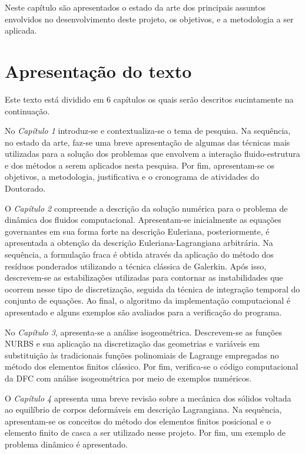 \documentclass[tese_patricia.tex]{subfiles}
\begin{document}
Neste capítulo são apresentados o estado da arte dos principais assuntos envolvidos no desenvolvimento deste projeto, os objetivos, e a metodologia a ser aplicada.


\section{Apresentação do texto}

Este texto está dividido em 6 capítulos os quais serão descritos sucintamente na continuação.

No \textit{Capítulo 1} introduz-se e contextualiza-se o tema de pesquisa. Na sequência, no estado da arte, faz-se uma breve apresentação de algumas das técnicas mais utilizadas para a solução dos problemas que envolvem a interação fluido-estrutura e dos métodos a serem aplicados nesta pesquisa. Por fim, apresentam-se os objetivos, a metodologia, justificativa e o cronograma de atividades do Doutorado.

O \textit{Capítulo 2} compreende a descrição da solução numérica para o problema de dinâmica dos fluidos computacional. Apresentam-se inicialmente as equações governantes em sua forma forte na descrição Euleriana, posteriormente, é apresentada a obtenção da descrição Euleriana-Lagrangiana arbitrária. Na sequência, a formulação fraca é obtida através da aplicação do método dos resíduos ponderados utilizando a técnica clássica de Galerkin. Após isso, descrevem-se as estabilizações utilizadas para contornar as instabilidades que ocorrem nesse tipo de discretização, seguida da técnica de integração temporal do conjunto de equações. Ao final, o algoritmo da implementação computacional é apresentado e alguns exemplos são avaliados para a verificação do programa.

No \textit{Capítulo 3}, apresenta-se a análise isogeométrica. Descrevem-se as funções NURBS e sua aplicação na discretização das geometrias e variáveis em substituição às tradicionais funções polinomiais de Lagrange empregadas no método dos elementos finitos clássico. Por fim, verifica-se o código computacional da DFC com análise isogeométrica por meio de exemplos numéricos.

O \textit{Capítulo 4} apresenta uma breve revisão sobre a mecânica dos sólidos voltada ao equilíbrio de corpos deformáveis em descrição Lagrangiana.  Na sequência, apresentam-se os conceitos do método dos elementos finitos posicional e o elemento finito de casca a ser utilizado nesse projeto. Por fim, um exemplo de problema dinâmico é apresentado.
\end{document}
